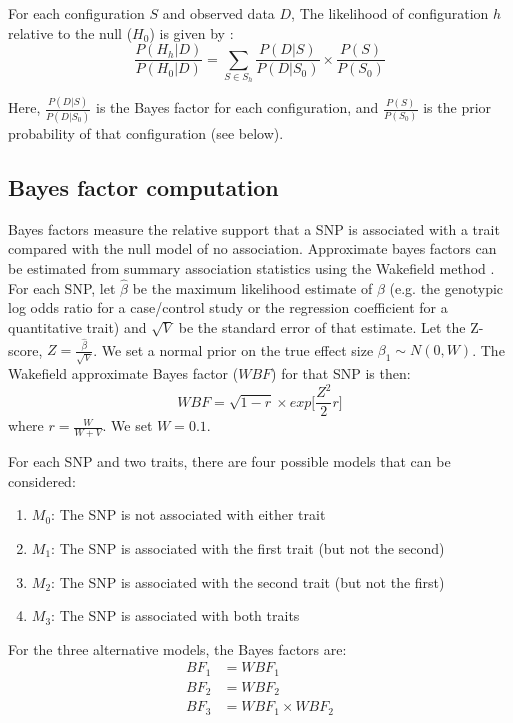 \documentclass{article}
\begin{document}
For each configuration $S$ and observed data $D$, The likelihood of configuration $h$ relative to the null ($H_0$) is given by \citep{Giambartolomei:2014aa}:
\begin{equation}
\label{rbf_equation}
\frac{P(H_h|D)}{P(H_0|D)} = \sum_{S \in S_h} \frac{P(D|S)}{P(D|S_0)} \times \frac{P(S)}{P(S_0)}
\end{equation}

\noindent Here, $\frac{P(D|S)}{P(D|S_0)}$ is the Bayes factor for each configuration, and $\frac{P(S)}{P(S_0)}$ is the prior probability of that configuration (see below).

\subsection{Bayes factor computation}
\label{bf_comp}
Bayes factors measure the relative support that a SNP is associated with a trait compared with the null model of no association. Approximate bayes factors can be estimated from summary association statistics using the Wakefield method \citep{Wakefield:2009aa}. For each SNP, let $\hat{\beta}$ be the maximum likelihood estimate of $\beta$ (e.g. the genotypic log odds ratio for a case/control study or the regression coefficient for a quantitative trait) and $\sqrt{V}$ be the standard error of that estimate. Let the Z-score, $Z = \frac{\hat{\beta}}{\sqrt{V}}$. We set a normal prior on the true effect size $\beta_1 \sim N(0,W)$. The Wakefield approximate Bayes factor ($WBF$) for that SNP is then:
\begin{equation}
WBF = \sqrt{1-r} \times exp \Big[\frac{Z^2}{2} r \Big]
\end{equation}
where $r = \frac{W}{W+V}$. We set $W = 0.1$.

For each SNP and two traits, there are four possible models that can be considered:
\begin{enumerate}[start=0]
  \item $M_0$: The SNP is not associated with either trait
  \item $M_1$: The SNP is associated with the first trait (but not the second)
  \item $M_2$: The SNP is associated with the second trait (but not the first)
  \item $M_3$: The SNP is associated with both traits
\end{enumerate}

\noindent For the three alternative models, the Bayes factors are:
\begin{align}
BF_1 & = WBF_1 \\
BF_2 & = WBF_2 \\
BF_3 & = WBF_1 \times WBF_2
\end{align}
\end{document}
